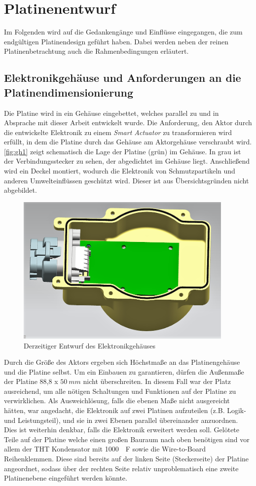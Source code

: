 \chapter{Platinenentwurf}\label{kap5}
Im Folgenden wird auf die Gedankengänge und Einflüsse eingegangen, die zum endgültigen Platinendesign geführt haben. Dabei werden neben der reinen Platinenbetrachtung auch die Rahmenbedingungen erläutert.
\section{Elektronikgehäuse und Anforderungen an die Platinendimensionierung}
Die Platine wird in ein Gehäuse eingebettet, welches parallel zu und in Absprache mit dieser Arbeit entwickelt wurde. Die Anforderung, den Aktor durch die entwickelte Elektronik zu einem \textit{Smart Actuator} zu transformieren wird erfüllt, in
dem die Platine durch das Gehäuse am Aktorgehäuse verschraubt wird. \autoref{fig:gh1} zeigt schematisch die Lage der Platine (grün) im Gehäuse. In grau ist der Verbindungsstecker zu sehen, der abgedichtet im Gehäuse liegt. Anschließend wird ein Deckel montiert, wodurch die Elektronik von Schmutzpartikeln und anderen Umwelteinflüssen geschützt wird. Dieser ist aus Übersichtsgründen nicht abgebildet.
\begin{figure}[H]%
\centering
\includegraphics[width=300pt]{./Bilder/Elektronik_Gehauese_ver3}%
\caption{Derzeitiger Entwurf des Elektronikgehäuses}%
\label{fig:gh1}%
\end{figure}\noindent
Durch die Größe des Aktors ergeben sich Höchstmaße an das Platinengehäuse und die Platine selbst. Um ein Einbauen zu garantieren, dürfen die Außenmaße der Platine 88,8 x $\SI{50}{mm}$ nicht überschreiten. In diesem Fall war der Platz ausreichend, um alle nötigen Schaltungen und Funktionen auf der Platine zu verwirklichen. Als Ausweichlösung, falls die ebenen Maße nicht ausgereicht hätten, war angedacht, die Elektronik auf zwei Platinen aufzuteilen (z.B. Logik- und Leistungsteil), und sie in zwei Ebenen parallel übereinander anzuordnen. Dies ist weiterhin denkbar, falls die Elektronik erweitert werden soll. Gelötete Teile auf der Platine welche einen großen Bauraum nach oben benötigen sind vor allem der THT Kondensator mit \SI{1000}{\mu F} sowie die Wire-to-Board Reihenklemmen. Diese sind bereits auf der linken Seite (Steckerseite) der Platine angeordnet, sodass über der rechten Seite relativ unproblematisch eine zweite Platinenebene eingeführt werden könnte.
